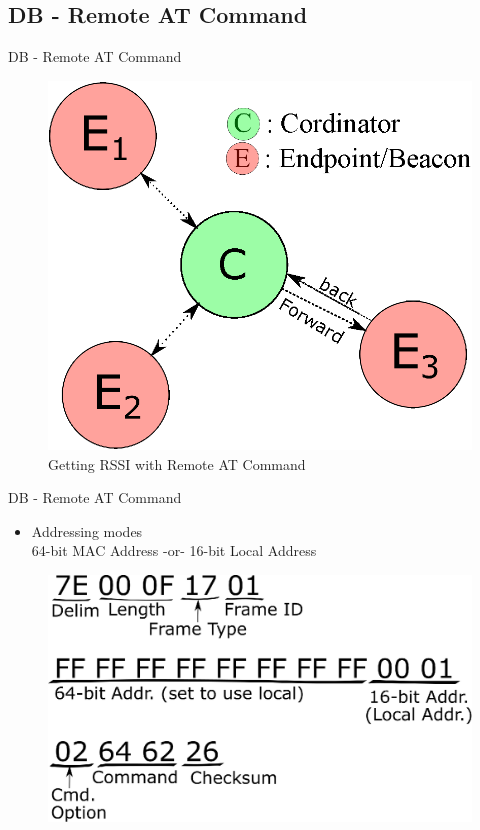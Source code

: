 \documentclass{beamer}
\begin{document}

\subsection{DB - Remote AT Command}
\begin{frame}{DB - Remote AT Command}
    \begin{figure}
    \centering
    \includegraphics[scale=.6]{figs/inkscape/XBeeRemoteDiagram}
    \caption{Getting RSSI with Remote AT Command}
    \label{fig:RSSIRemoteAT}
\end{figure}
\end{frame}

\begin{frame}{DB - Remote AT Command}
    \begin{itemize}
    \item Addressing modes\\
    64-bit MAC Address -or- 16-bit Local Address
    \end{itemize}
    
    \begin{figure}
    \centering
    \includegraphics[scale=0.4]{figs/inkscape/RemoteATBreakdown}
    \label{fig:RemoteATCommand}
    \end{figure}
\end{frame}
\end{document}
